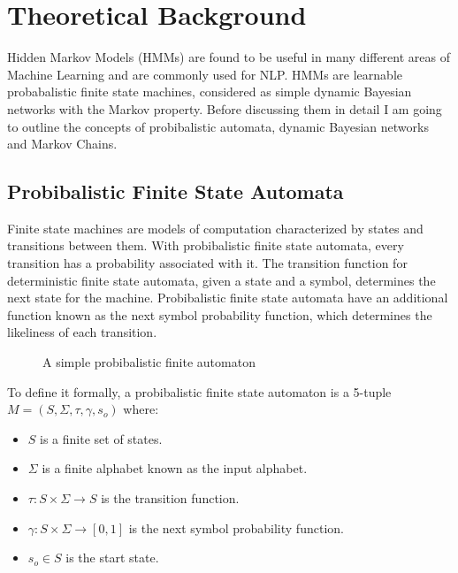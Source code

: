 \documentclass[10pt]{article}
\begin{document}
\section{Theoretical Background}
Hidden Markov Models (HMMs) are found to be useful in many different areas of Machine
Learning and are commonly used for NLP. HMMs are learnable probabalistic
finite state machines, considered as simple dynamic Bayesian networks
with the Markov property\cite{tech}. Before discussing them in detail I am going 
to outline the concepts of probibalistic automata, dynamic Bayesian networks and Markov Chains.

\subsection{Probibalistic Finite State Automata}
Finite state machines are models of computation characterized by
states and transitions between them. With probibalistic finite state automata, 
every transition has a probability associated with it. The transition function 
for deterministic finite state automata, given a state and a symbol, determines 
the next state for the machine. Probibalistic finite state automata have an
additional function known as the next symbol probability function, which
determines the likeliness of each transition. 

\begin{figure}[H]
\begin{center}
\caption{A simple probibalistic finite automaton}
\label{1}
\end{center}
\end{figure}

To define it formally, a probibalistic finite state automaton is a 5-tuple
$M = ( S, \Sigma, \tau, \gamma, s_o )$ where:
\cite{bell}
\begin{itemize}
\item[] $S$ is a finite set of states.
\item[] $\Sigma$ is a finite alphabet known as the input alphabet.
\item[] $\tau: S \times \Sigma \rightarrow S$ is the transition function.
\item[] $\gamma: S \times \Sigma \rightarrow [0,1]$ is the next symbol probability
function.
\item[] $s_o \in S$ is the start state.
\end{itemize}
\end{document}
